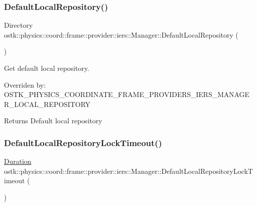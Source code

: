 \subsubsection{\texorpdfstring{Default\+Local\+Repository()}{DefaultLocalRepository()}}
{\footnotesize\ttfamily Directory ostk\+::physics\+::coord\+::frame\+::provider\+::iers\+::\+Manager\+::\+Default\+Local\+Repository (\begin{DoxyParamCaption}{ }\end{DoxyParamCaption})\hspace{0.3cm}{\ttfamily [static]}}



Get default local repository. 

Overriden by\+: O\+S\+T\+K\+\_\+\+P\+H\+Y\+S\+I\+C\+S\+\_\+\+C\+O\+O\+R\+D\+I\+N\+A\+T\+E\+\_\+\+F\+R\+A\+M\+E\+\_\+\+P\+R\+O\+V\+I\+D\+E\+R\+S\+\_\+\+I\+E\+R\+S\+\_\+\+M\+A\+N\+A\+G\+E\+R\+\_\+\+L\+O\+C\+A\+L\+\_\+\+R\+E\+P\+O\+S\+I\+T\+O\+RY

\begin{DoxyReturn}{Returns}
Default local repository 
\end{DoxyReturn}
\mbox{\label{classostk_1_1physics_1_1coord_1_1frame_1_1provider_1_1iers_1_1_manager_a00b7a5114cd80fbff515dd7af9381519}} 
\subsubsection{\texorpdfstring{Default\+Local\+Repository\+Lock\+Timeout()}{DefaultLocalRepositoryLockTimeout()}}
{\footnotesize\ttfamily \hyperlink{classostk_1_1physics_1_1time_1_1_duration}{Duration} ostk\+::physics\+::coord\+::frame\+::provider\+::iers\+::\+Manager\+::\+Default\+Local\+Repository\+Lock\+Timeout (\begin{DoxyParamCaption}{ }\end{DoxyParamCaption})\hspace{0.3cm}{\ttfamily [static]}}



